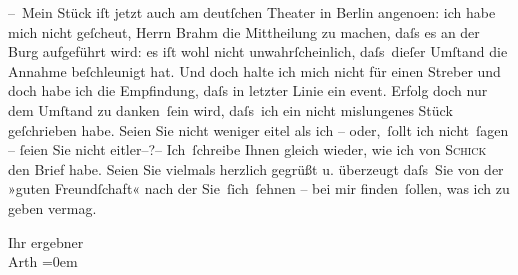 \pstart
           {\pb}– Mein Stück iſt jetzt auch am deutſchen Theater in Berlin angeno{\geminationm}en:
               ich habe mich nicht geſcheut, Herrn Brahm die
               Mittheilung zu machen, daſs es an der Burg
               aufgeführt wird: es iſt wohl nicht unwahrſcheinlich, daſs dieſer Umſtand die Annahme
               beſchleunigt hat. Und doch halte ich mich nicht für einen Streber und doch habe ich
               die Empfindung, daſs in letzter Linie ein event. Erfolg doch nur dem
               Umſtand zu danken ſein wird, {\pb}daſs ich ein nicht mislungenes
                  Stück geſchrieben habe.
               Seien Sie nicht weniger eitel als ich – oder, ſollt ich nicht ſagen –{ }ſeien Sie nicht
               eitler–?– Ich ſchreibe Ihnen gleich wieder, wie ich von \textsc{Schick} den Brief habe. Seien Sie vielmals herzlich gegrüßt u. überzeugt daſs Sie von
               der »guten Freundſchaft« nach der Sie ſich ſehnen – bei mir finden ſollen, was ich zu
               geben vermag.\pend
           
\pstart
           Ihr ergebner{\\[\baselineskip]}\spacefill\mbox{Arth}\pend
           \leftskip=0em{}\endnumbering{}
\begin{anhang}
\end{anhang}\newcommand{\dateiname}{L03924}\newcommand{\titel}{Arthur Schnitzler an Theodor Herzl, 18. 2. 189[5]}\newcommand{\editorInnen}{Herausgegeben von Jahnke, SelmaMüller, Martin Anton}
